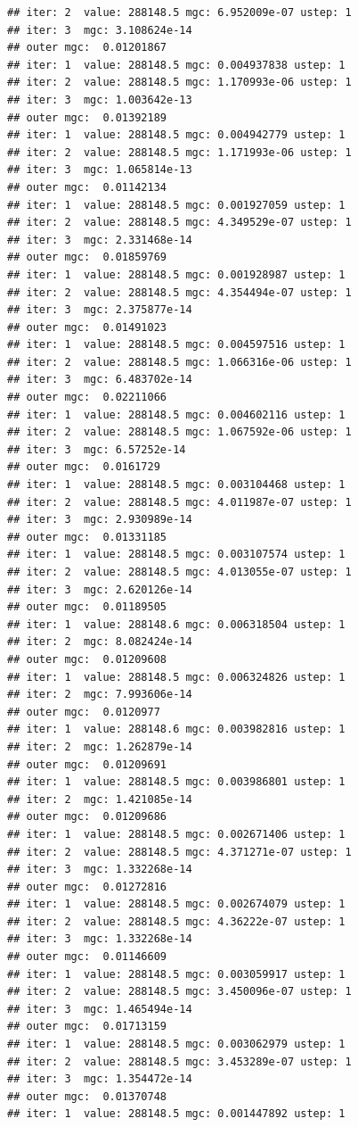 \documentclass{article}\usepackage[]{graphicx}\usepackage[]{xcolor}
\makeatletter
\newenvironment{kframe}{%
 \def\at@end@of@kframe{}%
 \ifinner\ifhmode%
  \def\at@end@of@kframe{\end{minipage}}%
  \begin{minipage}{\columnwidth}%
 \fi\fi%
 \def\FrameCommand##1{\hskip\@totalleftmargin \hskip-\fboxsep
 \colorbox{shadecolor}{##1}\hskip-\fboxsep
     \hskip-\linewidth \hskip-\@totalleftmargin \hskip\columnwidth}%
 \MakeFramed {\advance\hsize-\width
   \@totalleftmargin\z@ \linewidth\hsize
   \@setminipage}}%
 {\par\unskip\endMakeFramed%
 \at@end@of@kframe}
\newenvironment{knitrout}{}{} %
\makeatother
\begin{document}
\begin{knitrout}
\begin{kframe}
\begin{verbatim}
## iter: 2  value: 288148.5 mgc: 6.952009e-07 ustep: 1 
## iter: 3  mgc: 3.108624e-14 
## outer mgc:  0.01201867 
## iter: 1  value: 288148.5 mgc: 0.004937838 ustep: 1 
## iter: 2  value: 288148.5 mgc: 1.170993e-06 ustep: 1 
## iter: 3  mgc: 1.003642e-13 
## outer mgc:  0.01392189 
## iter: 1  value: 288148.5 mgc: 0.004942779 ustep: 1 
## iter: 2  value: 288148.5 mgc: 1.171993e-06 ustep: 1 
## iter: 3  mgc: 1.065814e-13 
## outer mgc:  0.01142134 
## iter: 1  value: 288148.5 mgc: 0.001927059 ustep: 1 
## iter: 2  value: 288148.5 mgc: 4.349529e-07 ustep: 1 
## iter: 3  mgc: 2.331468e-14 
## outer mgc:  0.01859769 
## iter: 1  value: 288148.5 mgc: 0.001928987 ustep: 1 
## iter: 2  value: 288148.5 mgc: 4.354494e-07 ustep: 1 
## iter: 3  mgc: 2.375877e-14 
## outer mgc:  0.01491023 
## iter: 1  value: 288148.5 mgc: 0.004597516 ustep: 1 
## iter: 2  value: 288148.5 mgc: 1.066316e-06 ustep: 1 
## iter: 3  mgc: 6.483702e-14 
## outer mgc:  0.02211066 
## iter: 1  value: 288148.5 mgc: 0.004602116 ustep: 1 
## iter: 2  value: 288148.5 mgc: 1.067592e-06 ustep: 1 
## iter: 3  mgc: 6.57252e-14 
## outer mgc:  0.0161729 
## iter: 1  value: 288148.5 mgc: 0.003104468 ustep: 1 
## iter: 2  value: 288148.5 mgc: 4.011987e-07 ustep: 1 
## iter: 3  mgc: 2.930989e-14 
## outer mgc:  0.01331185 
## iter: 1  value: 288148.5 mgc: 0.003107574 ustep: 1 
## iter: 2  value: 288148.5 mgc: 4.013055e-07 ustep: 1 
## iter: 3  mgc: 2.620126e-14 
## outer mgc:  0.01189505 
## iter: 1  value: 288148.6 mgc: 0.006318504 ustep: 1 
## iter: 2  mgc: 8.082424e-14 
## outer mgc:  0.01209608 
## iter: 1  value: 288148.5 mgc: 0.006324826 ustep: 1 
## iter: 2  mgc: 7.993606e-14 
## outer mgc:  0.0120977 
## iter: 1  value: 288148.6 mgc: 0.003982816 ustep: 1 
## iter: 2  mgc: 1.262879e-14 
## outer mgc:  0.01209691 
## iter: 1  value: 288148.5 mgc: 0.003986801 ustep: 1 
## iter: 2  mgc: 1.421085e-14 
## outer mgc:  0.01209686 
## iter: 1  value: 288148.5 mgc: 0.002671406 ustep: 1 
## iter: 2  value: 288148.5 mgc: 4.371271e-07 ustep: 1 
## iter: 3  mgc: 1.332268e-14 
## outer mgc:  0.01272816 
## iter: 1  value: 288148.5 mgc: 0.002674079 ustep: 1 
## iter: 2  value: 288148.5 mgc: 4.36222e-07 ustep: 1 
## iter: 3  mgc: 1.332268e-14 
## outer mgc:  0.01146609 
## iter: 1  value: 288148.5 mgc: 0.003059917 ustep: 1 
## iter: 2  value: 288148.5 mgc: 3.450096e-07 ustep: 1 
## iter: 3  mgc: 1.465494e-14 
## outer mgc:  0.01713159 
## iter: 1  value: 288148.5 mgc: 0.003062979 ustep: 1 
## iter: 2  value: 288148.5 mgc: 3.453289e-07 ustep: 1 
## iter: 3  mgc: 1.354472e-14 
## outer mgc:  0.01370748 
## iter: 1  value: 288148.5 mgc: 0.001447892 ustep: 1 

\end{verbatim}
\end{kframe}
\end{knitrout}
\end{document}
